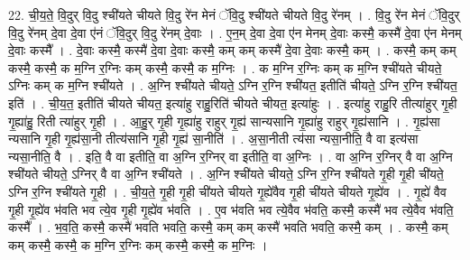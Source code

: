 \documentclass[17pt]{extarticle}
\begin{document}
22. ची॒य॒ते॒ वि॒दुर् वि॒दु श्ची॑यते चीयते वि॒दु रे॑न मेनं ॅवि॒दु श्ची॑यते चीयते वि॒दु रे॑नम् । . वि॒दु रे॑न मेनं ॅवि॒दुर् वि॒दु रे॑नम् दे॒वा दे॒वा ए॑नं ॅवि॒दुर् वि॒दु रे॑नम् दे॒वाः । . ए॒न॒म् दे॒वा दे॒वा ए॑न मेनम् दे॒वाः कस्मै॒ कस्मै॑ दे॒वा ए॑न मेनम् दे॒वाः कस्मै᳚ । . दे॒वाः कस्मै॒ कस्मै॑ दे॒वा दे॒वाः कस्मै॒ कम् कम् कस्मै॑ दे॒वा दे॒वाः कस्मै॒ कम् । . कस्मै॒ कम् कम् कस्मै॒ कस्मै॒ क म॒ग्नि र॒ग्निः कम् कस्मै॒ कस्मै॒ क म॒ग्निः । . क म॒ग्नि र॒ग्निः कम् क म॒ग्नि श्ची॑यते चीयते॒ ऽग्निः कम् क म॒ग्नि श्ची॑यते । . अ॒ग्नि श्ची॑यते चीयते॒ ऽग्नि र॒ग्नि श्ची॑यत॒ इतीति॑ चीयते॒ ऽग्नि र॒ग्नि श्ची॑यत॒ इति॑ । . ची॒य॒त॒ इतीति॑ चीयते चीयत॒ इत्या॑हु राहु॒रिति॑ चीयते चीयत॒ इत्या॑हुः । . इत्या॑हु राहु॒रि तीत्या॑हुर् गृ॒ही गृ॒ह्या॑हु॒ रिती त्या॑हुर् गृ॒ही । . आ॒हु॒र् गृ॒ही गृ॒ह्या॑हु राहुर् गृ॒ह्य॑ सान्यसानि गृ॒ह्या॑हु राहुर् गृ॒ह्य॑सानि । . गृ॒ह्य॑सा न्यसानि गृ॒ही गृ॒ह्य॑सा॒नी तीत्य॑सानि गृ॒ही गृ॒ह्य॑ सा॒नीति॑ । . अ॒सा॒नीती त्य॑सा न्यसा॒नीति॒ वै वा इत्य॑सा न्यसा॒नीति॒ वै । . इति॒ वै वा इतीति॒ वा अ॒ग्नि र॒ग्निर् वा इतीति॒ वा अ॒ग्निः । . वा अ॒ग्नि र॒ग्निर् वै वा अ॒ग्नि श्ची॑यते चीयते॒ ऽग्निर् वै वा अ॒ग्नि श्ची॑यते । . अ॒ग्नि श्ची॑यते चीयते॒ ऽग्नि र॒ग्नि श्ची॑यते गृ॒ही गृ॒ही ची॑यते॒ ऽग्नि र॒ग्नि श्ची॑यते गृ॒ही । . ची॒य॒ते॒ गृ॒ही गृ॒ही ची॑यते चीयते गृ॒ह्ये॑वैव गृ॒ही ची॑यते चीयते गृ॒ह्ये॑व । . गृ॒ह्ये॑ वैव गृ॒ही गृ॒ह्ये॑व भ॑वति भव त्ये॒व गृ॒ही गृ॒ह्ये॑व भ॑वति । . ए॒व भ॑वति भव त्ये॒वैव भ॑वति॒ कस्मै॒ कस्मै॑ भव त्ये॒वैव भ॑वति॒ कस्मै᳚ । . भ॒व॒ति॒ कस्मै॒ कस्मै॑ भवति भवति॒ कस्मै॒ कम् कम् कस्मै॑ भवति भवति॒ कस्मै॒ कम् । . कस्मै॒ कम् कम् कस्मै॒ कस्मै॒ क म॒ग्नि र॒ग्निः कम् कस्मै॒ कस्मै॒ क म॒ग्निः । \newline
\end{document}
